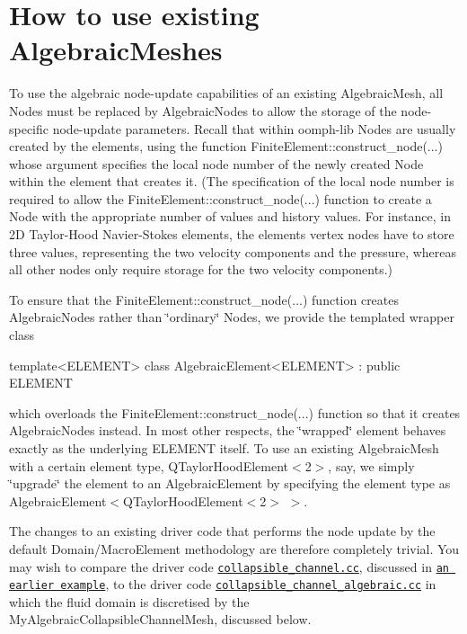 \hypertarget{index_how_to_use}{}\section{How to use existing Algebraic\+Meshes}\label{index_how_to_use}
To use the algebraic node-\/update capabilities of an existing {\ttfamily Algebraic\+Mesh}, all {\ttfamily Nodes} must be replaced by {\ttfamily Algebraic\+Nodes} to allow the storage of the node-\/specific node-\/update parameters. Recall that within {\ttfamily oomph-\/lib} {\ttfamily Nodes} are usually created by the elements, using the function {\ttfamily Finite\+Element\+::construct\+\_\+node}(...) whose argument specifies the local node number of the newly created {\ttfamily Node} within the element that creates it. (The specification of the local node number is required to allow the {\ttfamily Finite\+Element\+::construct\+\_\+node}(...) function to create a {\ttfamily Node} with the appropriate number of values and history values. For instance, in 2D Taylor-\/\+Hood Navier-\/\+Stokes elements, the elements\textquotesingle{} vertex nodes have to store three values, representing the two velocity components and the pressure, whereas all other nodes only require storage for the two velocity components.)

To ensure that the {\ttfamily Finite\+Element\+::construct\+\_\+node}(...) function creates {\ttfamily Algebraic\+Nodes} rather than \char`\"{}ordinary\char`\"{} {\ttfamily Nodes}, we provide the templated wrapper class


\begin{DoxyCode}
\textcolor{keyword}{template}<ELEMENT>
\textcolor{keyword}{class }AlgebraicElement<ELEMENT> : \textcolor{keyword}{public} ELEMENT
\end{DoxyCode}


which overloads the {\ttfamily Finite\+Element\+::construct\+\_\+node}(...) function so that it creates {\ttfamily Algebraic\+Nodes} instead. In most other respects, the \char`\"{}wrapped\char`\"{} element behaves exactly as the underlying {\ttfamily E\+L\+E\+M\+E\+NT} itself. To use an existing {\ttfamily Algebraic\+Mesh} with a certain element type, {\ttfamily Q\+Taylor\+Hood\+Element$<$2$>$}, say, we simply \char`\"{}upgrade\char`\"{} the element to an {\ttfamily Algebraic\+Element} by specifying the element type as {\ttfamily Algebraic\+Element$<$Q\+Taylor\+Hood\+Element$<$2$>$} $>$.

The changes to an existing driver code that performs the node update by the default {\ttfamily Domain/\+Macro\+Element} methodology are therefore completely trivial. You may wish to compare the driver code \href{../../../../demo_drivers/navier_stokes/collapsible_channel/collapsible_channel.cc}{\tt collapsible\+\_\+channel.\+cc}, discussed in \href{../../collapsible_channel/html/index.html}{\tt an earlier example}, to the driver code \href{../../../../demo_drivers/navier_stokes/collapsible_channel/collapsible_channel_algebraic.cc}{\tt collapsible\+\_\+channel\+\_\+algebraic.\+cc} in which the fluid domain is discretised by the {\ttfamily My\+Algebraic\+Collapsible\+Channel\+Mesh}, discussed below.



